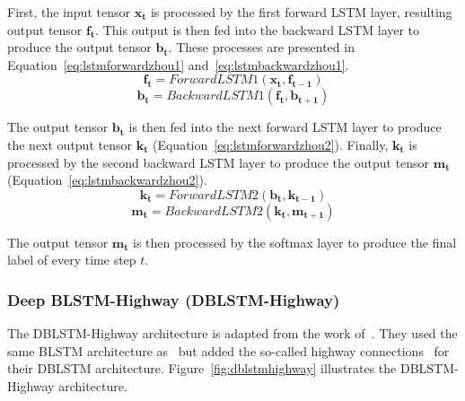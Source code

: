 First, the input tensor $\mathbf{x_{t}}$ is processed by the first forward LSTM layer, resulting output tensor $\mathbf{f_{t}}$. This output is then fed into the backward LSTM layer to produce the output tensor $\mathbf{b_{t}}$. These processes are presented in Equation~\ref{eq:lstmforwardzhou1} and~\ref{eq:lstmbackwardzhou1}.
\begin{equation}
\label{eq:lstmforwardzhou1}
\mathbf{f_{t}} = ForwardLSTM1(\mathbf{x_{t}}, \mathbf{f_{t-1}})
\end{equation}
\begin{equation}
\label{eq:lstmbackwardzhou1}
\mathbf{b_{t}} = BackwardLSTM1(\mathbf{f_{t}}, \mathbf{b_{t+1}})
\end{equation}

The output tensor $\mathbf{b_{t}}$ is then fed into the next forward LSTM layer to produce the next output tensor $\mathbf{k_{t}}$ (Equation~\ref{eq:lstmforwardzhou2}). Finally, $\mathbf{k_{t}}$ is processed by the second backward LSTM layer to produce the output tensor $\mathbf{m_{t}}$ (Equation~\ref{eq:lstmbackwardzhou2}).
\begin{equation}
\label{eq:lstmforwardzhou2}
\mathbf{k_{t}} = ForwardLSTM2(\mathbf{b_{t}}, \mathbf{k_{t-1}})
\end{equation}
\begin{equation}
\label{eq:lstmbackwardzhou2}
\mathbf{m_{t}} = BackwardLSTM2(\mathbf{k_{t}}, \mathbf{m_{t+1}})
\end{equation}

The output tensor $\mathbf{m_{t}}$ is then processed by the softmax layer to produce the final label of every time step $t$.

\subsubsection{Deep BLSTM-Highway (DBLSTM-Highway)}
The DBLSTM-Highway architecture is adapted from the work of~\cite{he2017deep}. They used the same BLSTM architecture as~\cite{zhou2015end} but added the so-called highway connections~\citep{srivastava2015training} for their DBLSTM architecture. Figure~\ref{fig:dblstmhighway} illustrates the DBLSTM-Highway architecture.

